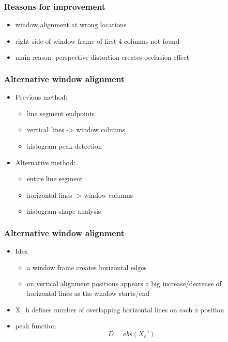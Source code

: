 \documentclass{beamer}
\begin{document}
\frame
{
	\frametitle{Reasons for improvement}
	\begin{itemize}
	\item window alignment at wrong locations
	\item right side of window frame of first 4 columns not found
	\item main reason: perspective distortion creates occlusion effect
	\end{itemize}
}

\frame
{
}

\frame
{
	\frametitle{Alternative window alignment}
	\begin{itemize}
	\item Previous method: 
		\begin{itemize}
		\item line segment endpoints
		\item vertical lines -> window columns
		\item histogram peak detection
		\end{itemize}
	\item Alternative method: 
		\begin{itemize}
		\item entire line segment
		\item horizontal lines -> window columns
		\item histogram shape analysis
		\end{itemize}
	\end{itemize}
}

\frame
{
	\frametitle{Alternative window alignment}
	\begin{itemize}
	\item Idea
		\begin{itemize}
		\item a window frame creates horizontal edges
		\item on vertical alignment positions appears a big increase/decrease
		of horizontal lines as the window starts/end
		\end{itemize}
	\item X_{h} defines number of overlapping horizontal lines on each x
	position
	\item peak function \[D = abs( X_{h}')\]
	\end{itemize}
}
\end{document}
